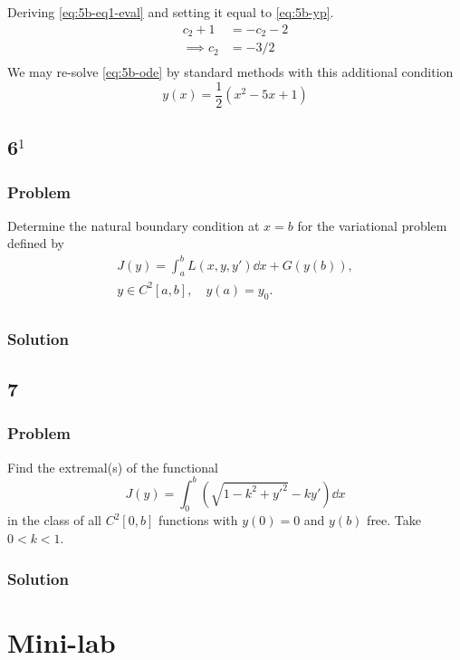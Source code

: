\documentclass[12pt,twoside]{article}
\begin{document}
Deriving \cref{eq:5b-eq1-eval} and setting it equal to \cref{eq:5b-yp}.
\begin{equation*}
  \begin{aligned}
    c_2 + 1 &= -c_2 - 2 \\
    \implies c_2 &= -3/2 \\
  \end{aligned}
\end{equation*}
We may re-solve \cref{eq:5b-ode} by standard methods with this additional condition
\begin{equation*}
\boxed{y(x) = \frac{1}{2} \left(x^2-5 x+1\right)}
\end{equation*}

\subsection{6$^1$}
\subsubsection*{Problem}
Determine the natural boundary condition at $x=b$ for the variational problem
defined by
\begin{equation}
  \begin{aligned}
    J(y) = \int_a^b L(x,y,y')\dd{x}+G(y(b)), \\
    y\in C^2[a,b],\quad y(a)=y_0. \\
  \end{aligned}
\end{equation}

\subsubsection*{Solution}
\todo{}

\subsection{7}
\subsubsection*{Problem}
Find the extremal{(s)} of the functional
\begin{equation}
  \label{eq:7-problem}
  J(y)=\int_0^b(\sqrt{1-k^2+y'^2}-ky') \dd{x}
\end{equation}
in the class of all $C^2[0,b]$ functions with $y(0)=0$ and $y(b)$ free. Take
$0<k<1$.

\subsubsection*{Solution}
\todo{}

\section{Mini-lab}
\end{document}
